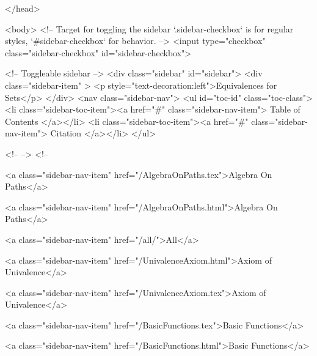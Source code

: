   
</head>




  <body>
    <!-- Target for toggling the sidebar `.sidebar-checkbox` is for regular
     styles, `#sidebar-checkbox` for behavior. -->
<input type="checkbox" class="sidebar-checkbox" id="sidebar-checkbox">

<!-- Toggleable sidebar -->
<div class="sidebar" id="sidebar">
  <div class="sidebar-item" >
    <p style="text-decoration:left">Equivalences for Sets</p>
  </div>
  <nav class="sidebar-nav">
    <ul id="toc-id" class="toc-class">
  <li class="sidebar-toc-item"><a href="#" class="sidebar-nav-item"> Table of Contents </a></li>
  <li class="sidebar-toc-item"><a href="#" class="sidebar-nav-item"> Citation </a></li>
</ul>


    <!--  -->
    <!-- 
      
    
      
    
      
    
      
        
      
    
      
        
          <a class="sidebar-nav-item" href="/AlgebraOnPaths.tex">Algebra On Paths</a>
        
      
    
      
        
          <a class="sidebar-nav-item" href="/AlgebraOnPaths.html">Algebra On Paths</a>
        
      
    
      
        
          <a class="sidebar-nav-item" href="/all/">All</a>
        
      
    
      
        
          <a class="sidebar-nav-item" href="/UnivalenceAxiom.html">Axiom of Univalence</a>
        
      
    
      
        
          <a class="sidebar-nav-item" href="/UnivalenceAxiom.tex">Axiom of Univalence</a>
        
      
    
      
        
          <a class="sidebar-nav-item" href="/BasicFunctions.tex">Basic Functions</a>
        
      
    
      
        
          <a class="sidebar-nav-item" href="/BasicFunctions.html">Basic Functions</a>
        
